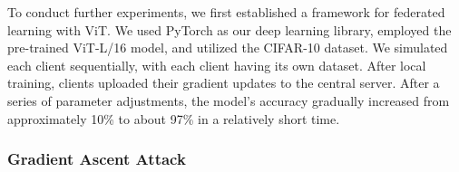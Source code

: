 \documentclass[conference]{IEEEtran}
\begin{document}

To conduct further experiments, we first established a framework for federated learning with ViT. We used PyTorch as our deep learning library, employed the pre-trained ViT-L/16 model, and utilized the CIFAR-10 dataset. We simulated each client sequentially, with each client having its own dataset. After local training, clients uploaded their gradient updates to the central server. After a series of parameter adjustments, the model's accuracy gradually increased from approximately 10\% to about 97\% in a relatively short time.

\subsubsection{\textbf{Gradient Ascent Attack}}
\label{exp:attack:grad}


\end{document}
